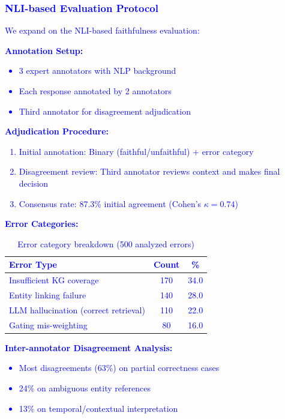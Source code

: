 \documentclass[10pt,twocolumn]{article}
\newcommand{\revision}[1]{\textcolor{blue}{#1}}
\begin{document}
\revision{
\subsubsection{NLI-based Evaluation Protocol}
\label{sec:nli_protocol}

We expand on the NLI-based faithfulness evaluation:

\textbf{Annotation Setup:}
\begin{itemize}
    \item 3 expert annotators with NLP background
    \item Each response annotated by 2 annotators
    \item Third annotator for disagreement adjudication
\end{itemize}

\textbf{Adjudication Procedure:}
\begin{enumerate}
    \item Initial annotation: Binary (faithful/unfaithful) + error category
    \item Disagreement review: Third annotator reviews context and makes final decision
    \item Consensus rate: 87.3\% initial agreement (Cohen's $\kappa = 0.74$)
\end{enumerate}

\textbf{Error Categories:}
\begin{table}[h]
\centering
\caption{Error category breakdown (500 analyzed errors)}
\label{tab:error_categories}
\small
\begin{tabular}{@{}lcc@{}}
\toprule
\textbf{Error Type} & \textbf{Count} & \textbf{\%} \\
\midrule
Insufficient KG coverage & 170 & 34.0 \\
Entity linking failure & 140 & 28.0 \\
LLM hallucination (correct retrieval) & 110 & 22.0 \\
Gating mis-weighting & 80 & 16.0 \\
\bottomrule
\end{tabular}
\end{table}

\textbf{Inter-annotator Disagreement Analysis:}
\begin{itemize}
    \item Most disagreements (63\%) on partial correctness cases
    \item 24\% on ambiguous entity references
    \item 13\% on temporal/contextual interpretation
\end{itemize}
}
\end{document}
